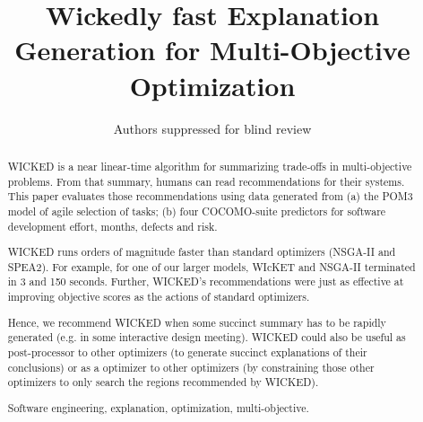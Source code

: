 \documentclass[runningheads]{llncs}
\newcommand{\keywords}[1]{\par\addvspace\baselineskip
\noindent\keywordname\enspace\ignorespaces#1}
\begin{document}
%

\mainmatter  %

\title{Wickedly fast Explanation Generation
for Multi-Objective Optimization}


%
%
\author{Authors suppressed for blind review}

%


%
%
 
\maketitle


\begin{abstract}
WICKED is a near linear-time 
algorithm for summarizing trade-offs in multi-objective problems.
From that summary, humans can read recommendations for their systems.
This paper evaluates those recommendations using data
generated from   (a) the POM3 model of agile selection
of tasks; (b) four COCOMO-suite predictors for software
development effort, months, defects and risk.

WICKED runs orders of magnitude faster than  standard optimizers (NSGA-II and SPEA2). For example, for one of our larger models,
WIcKET and NSGA-II terminated in 
3 and 150 seconds.
Further,  WICKED's recommendations
 were just as effective at improving objective
scores as the actions of standard  optimizers.

Hence, we recommend WICKED when some succinct summary
has to be rapidly generated (e.g.  in some
interactive design meeting). WICKED could also be
useful as post-processor to other optimizers (to
generate succinct explanations of their conclusions)
or as a optimizer to other optimizers (by
constraining those other optimizers to only search
the regions recommended by WICKED).

\keywords{Software engineering, explanation, optimization, multi-objective.}
\end{abstract}
\end{document}
